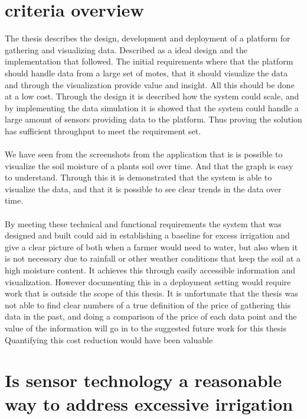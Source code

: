 \documentclass[]{uiophd}
\begin{document}
\section{criteria overview}
The thesis describes the design, development and deployment of a platform for gathering and visualizing data. Described as a ideal design and the implementation that followed. The initial requirements where that the platform should handle data from a large set of motes, that it should visualize the data and through the visualization provide value and insight. All this should be done at a low cost. Through the design it is described how the system could scale, and by implementing the data simulation it is showed that the system could handle a large amount of sensors providing data to the platform. Thus proving the solution has sufficient throughput to meet the requirement set.
\\\\
We have seen from the screenshots from the application that is is possible to visualize the soil moisture of a plants soil over time. And that the graph is easy to understand. Through this it is demonstrated that the system is able to visualize the data, and that it is possible to see clear trends in the data over time.
\\\\
By meeting these technical and functional requirements the system that was  designed and built could aid in establishing a baseline for excess irrigation and give a clear picture of both when a farmer would need to water, but also when it is not necessary due to rainfall or other weather conditions that keep the soil at a high moisture content. It achieves this through easily accessible information and visualization. However documenting this in a deployment setting would require work that is outside the scope of this thesis. It is unfortunate that the thesis was not able to find clear numbers of a true definition of the price of gathering this data in the past, and doing a comparison of the price of each data point and the value of the information will go in to the suggested future work for this thesis Quantifying this cost reduction would have been valuable


\section{ Is sensor technology a reasonable way to address excessive irrigation}
\end{document}
